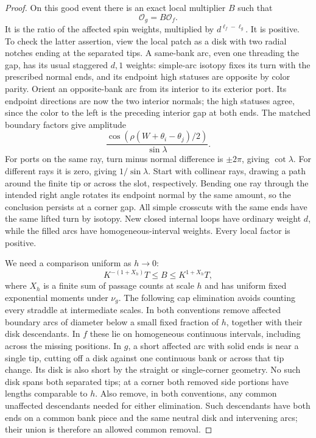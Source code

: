 \begin{proof}
On this good event there is an exact local multiplier $B$ such that
\begin{equation}
 \mathcal O_g=B\mathcal O_f.
 \label{gap:pointwise}
\end{equation}
It is the ratio of the affected spin weights, multiplied by
$d^{\ell_f-\ell_g}$.  It is positive.  To check the latter assertion,
view the local patch as a disk with two radial notches ending at the
separated tips.  A same-bank arc, even one threading the gap, has its
usual staggered $d,1$ weights: simple-arc isotopy fixes its turn with
the prescribed normal ends, and its endpoint high statuses are
opposite by color parity.  Orient an opposite-bank arc from its
interior to its exterior port.  Its endpoint directions are now the
two interior normals; the high statuses agree, since the color to
the left is the preceding interior gap at both ends.  The matched
boundary factors give amplitude
\begin{equation}
 \frac{\cos(\rho(W+\theta_i-\theta_j)/2)}{\sin\lambda}.
 \label{gap:cross-bank-amplitude}
\end{equation}
For ports on the same ray, turn minus normal difference is $\pm2\pi$,
giving $\cot\lambda$.  For different rays it is zero, giving
$1/\sin\lambda$.  Start with collinear rays, drawing a path around
the finite tip or across the slot, respectively.  Bending one ray
through the intended right angle rotates its endpoint normal by the
same amount, so the conclusion persists at a corner gap.  All simple
crosscuts with the same ends have the same lifted turn by isotopy.
New closed internal loops have ordinary weight $d$, while the filled
arcs have homogeneous-interval weights.  Every local factor is positive.

We need a comparison uniform as $h\to0$:
\begin{equation}
 K^{-(1+X_h)}T\le B\le K^{1+X_h}T,
 \label{gap:B-bound}
\end{equation}
where $X_h$ is a finite sum of passage counts at scale $h$ and has
uniform fixed exponential moments under $\nu_g$.  The following
cap elimination avoids counting every straddle at intermediate scales.
In both conventions remove affected boundary arcs of diameter below
a small fixed fraction of $h$, together with their disk descendants.
In $f$ these lie on homogeneous continuous intervals, including across
the missing positions.  In $g$, a short affected arc with solid ends
is near a single tip, cutting off a disk against one continuous bank
or across that tip change.  Its disk is also short by the straight or
single-corner geometry.  No such disk spans both separated tips; at
a corner both removed side portions have lengths comparable to $h$.
Also remove, in both conventions, any common unaffected descendants
needed for either elimination.  Such descendants have both ends on a
common bank piece and the same neutral disk and intervening arcs;
their union is therefore an allowed common removal.


\end{proof}
